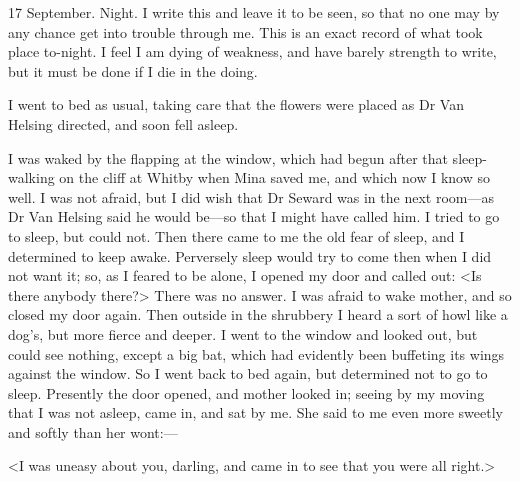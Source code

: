 \begin{diary}{17 September. Night.}
I write this and leave it to be seen, so that no one may by any chance get into trouble through me. This is an exact record of what took place to-night. I feel I am dying of weakness, and have barely strength to write, but it must be done if I die in the doing.

I went to bed as usual, taking care that the flowers were placed as Dr Van Helsing directed, and soon fell asleep.

I was waked by the flapping at the window, which had begun after that sleep-walking on the cliff at Whitby when Mina saved me, and which now I know so well. I was not afraid, but I did wish that Dr Seward was in the next room—as Dr Van Helsing said he would be—so that I might have called him. I tried to go to sleep, but could not. Then there came to me the old fear of sleep, and I determined to keep awake. Perversely sleep would try to come then when I did not want it; so, as I feared to be alone, I opened my door and called out: <Is there anybody there?> There was no answer. I was afraid to wake mother, and so closed my door again. Then outside in the shrubbery I heard a sort of howl like a dog's, but more fierce and deeper. I went to the window and looked out, but could see nothing, except a big bat, which had evidently been buffeting its wings against the window. So I went back to bed again, but determined not to go to sleep. Presently the door opened, and mother looked in; seeing by my moving that I was not asleep, came in, and sat by me. She said to me even more sweetly and softly than her wont:—

<I was uneasy about you, darling, and came in to see that you were all right.>


\end{diary}
